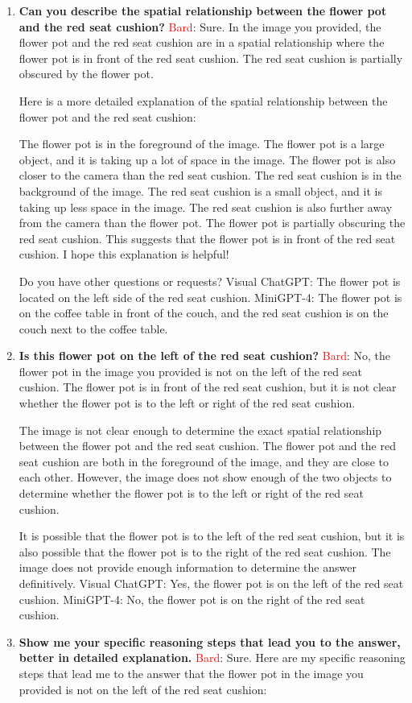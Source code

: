 \begin{enumerate}
    \item \textbf{Can you describe the spatial relationship between the flower pot and the red seat cushion?}
    \subitem \textcolor{Red}{Bard}: 
    Sure. In the image you provided, the flower pot and the red seat cushion are in a spatial relationship where the flower pot is in front of the red seat cushion. The red seat cushion is partially obscured by the flower pot.
    
    Here is a more detailed explanation of the spatial relationship between the flower pot and the red seat cushion:
    
    The flower pot is in the foreground of the image. The flower pot is a large object, and it is taking up a lot of space in the image. The flower pot is also closer to the camera than the red seat cushion.
    The red seat cushion is in the background of the image. The red seat cushion is a small object, and it is taking up less space in the image. The red seat cushion is also further away from the camera than the flower pot.
    The flower pot is partially obscuring the red seat cushion. This suggests that the flower pot is in front of the red seat cushion.
    I hope this explanation is helpful!
    
    Do you have other questions or requests?
    \subitem Visual ChatGPT: The flower pot is located on the left side of the red seat cushion.
    \subitem MiniGPT-4: The flower pot is on the coffee table in front of the couch, and the red seat cushion is on the couch next to the coffee table.
    \item \textbf{Is this flower pot on the left of the red seat cushion?}
    \subitem \textcolor{Red}{Bard}: 
    No, the flower pot in the image you provided is not on the left of the red seat cushion. The flower pot is in front of the red seat cushion, but it is not clear whether the flower pot is to the left or right of the red seat cushion.
    
    The image is not clear enough to determine the exact spatial relationship between the flower pot and the red seat cushion. The flower pot and the red seat cushion are both in the foreground of the image, and they are close to each other. However, the image does not show enough of the two objects to determine whether the flower pot is to the left or right of the red seat cushion.
    
    It is possible that the flower pot is to the left of the red seat cushion, but it is also possible that the flower pot is to the right of the red seat cushion. The image does not provide enough information to determine the answer definitively.
    \subitem Visual ChatGPT: Yes, the flower pot is on the left of the red seat cushion.
    \subitem MiniGPT-4: No, the flower pot is on the right of the red seat cushion.
    \item \textbf{Show me your specific reasoning steps that lead you to the answer, better in detailed explanation.}
    \subitem \textcolor{Red}{Bard}: Sure. Here are my specific reasoning steps that lead me to the answer that the flower pot in the image you provided is not on the left of the red seat cushion:


\end{enumerate}
